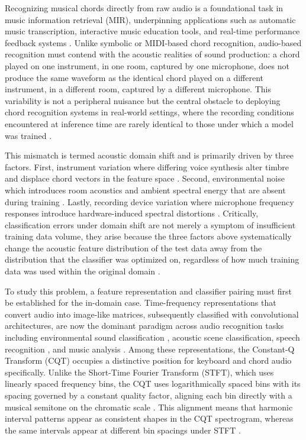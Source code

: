 \documentclass[pdflatex,sn-mathphys-num,iicol]{sn-jnl}
\theoremstyle{thmstyleone}
\theoremstyle{thmstyletwo}
\theoremstyle{thmstylethree}
\begin{document}
Recognizing musical chords directly from raw audio is a foundational task in music information retrieval (MIR), underpinning applications such as automatic music transcription, interactive music education tools, and real-time performance feedback systems \cite{Telila2023}\cite{Saputra2021}\cite{Moysis2023}. Unlike symbolic or MIDI-based chord recognition, audio-based recognition must contend with the acoustic realities of sound production: a chord played on one instrument, in one room, captured by one microphone, does not produce the same waveform as the identical chord played on a different instrument, in a different room, captured by a different microphone. This variability is not a peripheral nuisance but the central obstacle to deploying chord recognition systems in real-world settings, where the recording conditions encountered at inference time are rarely identical to those under which a model was trained \cite{Kusaka2024}.

This mismatch is termed acoustic domain shift and is primarily driven by three factors. First, instrument variation where differing voice synthesis alter timbre and displace chord vectors in the feature space \cite{Kusaka2024}\cite{Majchrzak2025}. Second, environmental noise which introduces room acoustics and ambient spectral energy that are absent during training \cite{Majchrzak2025}. Lastly, recording device variation where microphone frequency responses introduce hardware-induced spectral distortions \cite{Kusaka2024}. Critically, classification errors under domain shift are not merely a symptom of insufficient training data volume, they arise because the three factors above systematically change the acoustic feature distribution of the test data away from the distribution that the classifier was optimized on, regardless of how much training data was used within the original domain \cite{Kusaka2024}\cite{Majchrzak2025}.

To study this problem, a feature representation and classifier pairing must first be established for the in-domain case. Time-frequency representations that convert audio into image-like matrices, subsequently classified with convolutional architectures, are now the dominant paradigm across audio recognition tasks including environmental sound classification \cite{Wolf-Monheim2025}, acoustic scene classification, speech recognition \cite{Zaman2023}, and music analysis \cite{Moysis2023}. Among these representations, the Constant-Q Transform (CQT) occupies a distinctive position for keyboard and chord audio specifically. Unlike the Short-Time Fourier Transform (STFT), which uses linearly spaced frequency bins, the CQT uses logarithmically spaced bins with its spacing governed by a constant quality factor, aligning each bin directly with a musical semitone on the chromatic scale \cite{Lacoste2007}. This alignment means that harmonic interval patterns appear as consistent shapes in the CQT spectrogram, whereas the same intervals appear at different bin spacings under STFT \cite{Li2021}.
\end{document}
